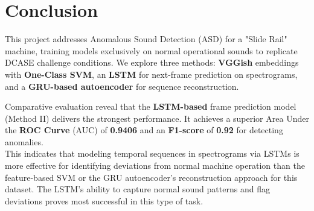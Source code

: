 \documentclass[ngerman]{scrartcl}
\begin{document}
\section*{Conclusion}

This project addresses Anomalous Sound Detection (ASD) for a "Slide Rail" machine, training models exclusively on normal operational sounds to replicate DCASE challenge conditions. We explore three methods: \textbf{VGGish} embeddings with\textbf{ One-Class SVM}, an \textbf{LSTM} for next-frame prediction on spectrograms, and a \textbf{GRU-based autoencoder} for sequence reconstruction.

Comparative evaluation reveal that the\textbf{ LSTM-based} frame prediction model (Method II) delivers the strongest performance. It achieves a superior Area Under the \textbf{ROC Curve} (AUC) of \textbf{0.9406} and an \textbf{F1-score} of\textbf{ 0.92} for detecting anomalies.\\
This indicates that modeling temporal sequences in spectrograms via LSTMs is more effective for identifying deviations from normal machine operation than the feature-based SVM or the GRU autoencoder's reconstruction approach for this dataset. The LSTM's ability to capture normal sound patterns and flag deviations proves most successful in this type of task.
\end{document}

